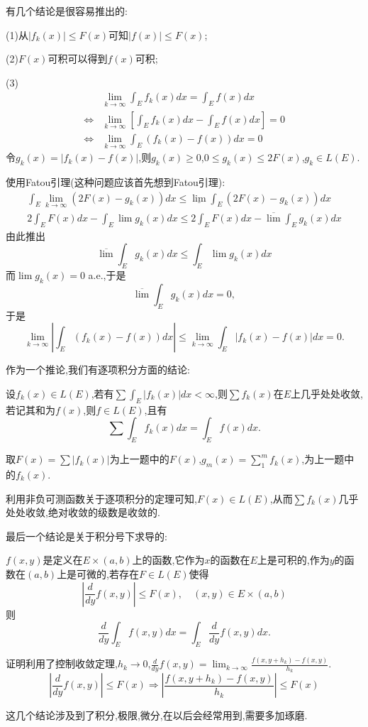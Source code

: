 \documentclass[12pt,a4paper,openany]{book}
\begin{document}
\begin{enumerate}
有几个结论是很容易推出的:

(1)从$|f_k(x)|\le F(x)$可知$|f(x)| \le F(x)$;

(2)$F(x)$可积可以得到$f(x)$可积;

(3)
\[
\begin{aligned}
&\lim_{k \rightarrow \infty}{\int_{E}{f_k(x)dx}} = \int_{E}{f(x)dx} \\
\Leftrightarrow &\lim_{k \rightarrow \infty}{[\int_{E}{f_k(x)dx} - \int_{E}{f(x)dx}]} = 0 \\
\Leftrightarrow &\lim_{k \rightarrow \infty}{\int_{E}{(f_k(x) - f(x))dx}} = 0
\end{aligned}
\]
令$g_k(x) = |f_k(x) - f(x)|$,则$g_k(x) \ge 0$,$0 \le g_k(x) \le 2F(x)$,$g_k \in L(E)$.

使用Fatou引理(这种问题应该首先想到Fatou引理):
\begin{gather*}
\int_{E}{\lim_{k \rightarrow \infty}{(2F(x) - g_k(x))}dx} \le \underline{\lim}\int_{E}{(2F(x)-g_k(x))dx} \\
2\int_{E}{F(x)dx} - \int_{E}{\lim{g_k(x)}dx} \le 2\int_{E}{F(x)dx} - \overline{\lim}\int_{E}{g_k(x)dx}
\end{gather*}
由此推出
\[
\overline{\lim}{\int_{E}{g_k(x)dx}} \le \int_{E}{\lim{g_k(x)}dx}
\]
而$\lim{g_k(x)} = 0$ a.e.,于是
\[
\overline{\lim}{\int_{E}{g_k(x)dx}} = 0,
\]
于是
\[
\lim_{k \rightarrow \infty}{|\int_{E}{(f_k(x) - f(x))dx}|} \le \lim_{k \rightarrow \infty}{\int_{E}{|f_k(x) - f(x)|dx}} = 0.
\]

作为一个推论,我们有逐项积分方面的结论:

设$f_k(x) \in L(E)$,若有$\sum{\int_{E}{|f_k(x)|dx}} < \infty$,则$\sum{f_k(x)}$在$E$上几乎处处收敛,若记其和为$f(x)$,则$f \in L(E)$,且有
\[
\sum{\int_{E}{f_k(x)dx}} = \int_{E}{f(x)dx}.
\]

取$F(x) = \sum{|f_k(x)|}$为上一题中的$F(x)$,$g_m(x) = \sum_{1}^{m}{f_k(x)}$,为上一题中的$f_k(x)$.

利用非负可测函数关于逐项积分的定理可知,$F(x) \in L(E)$,从而$\sum{f_k(x)}$几乎处处收敛,绝对收敛的级数是收敛的.

最后一个结论是关于积分号下求导的:

$f(x,y)$是定义在$E \times (a,b)$上的函数,它作为$x$的函数在$E$上是可积的,作为$y$的函数在$(a,b)$上是可微的,若存在$F \in L(E)$使得
\[
|\frac{d}{dy}f(x,y)| \le F(x), \quad (x,y) \in E \times (a,b)
\]
则
\[
\frac{d}{dy}\int_{E}{f(x,y)dx} = \int_{E}{\frac{d}{dy}f(x,y)dx}.
\]

证明利用了控制收敛定理,$h_k \rightarrow 0$,$\frac{d}{dy}f(x,y) = \lim_{k \rightarrow \infty}{\frac{f(x,y+h_k) - f(x,y)}{h_k}}$.
\[
|\frac{d}{dy}f(x,y)| \le F(x) \Rightarrow |\frac{f(x,y+h_k) - f(x,y)}{h_k}| \le F(x)
\]

这几个结论涉及到了积分,极限,微分,在以后会经常用到,需要多加琢磨.
\end{enumerate}
\end{document}
